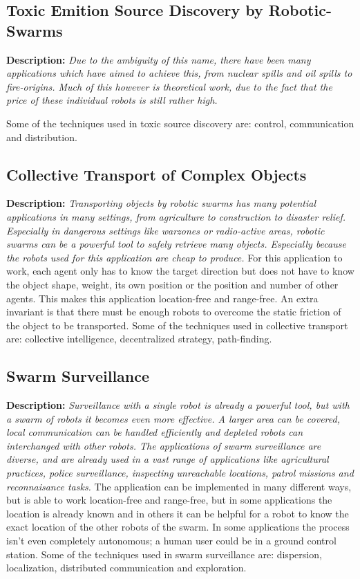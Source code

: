   \subsection{Toxic Emition Source Discovery by Robotic-Swarms}
  \textbf{Description: }\emph{Due to the ambiguity of this name, there have been many applications which have aimed to achieve this, from nuclear spills and oil spills to fire-origins. Much of this however is theoretical work, due to the fact that the price of these individual robots is still rather high.}

  Some of the techniques used in toxic source discovery are: control, communication and distribution.\cite{Li2012}

 \subsection{Collective Transport of Complex Objects}
 \textbf{Description: } \emph{Transporting objects by robotic swarms has many potential applications in many settings, from agriculture to construction to disaster relief. Especially in dangerous settings like warzones or radio-active areas, robotic swarms can be a powerful tool to safely retrieve many objects. Especially because the robots used for this application are cheap to produce. }
For this application to work, each agent only has to know the target direction but does not have to know the object shape, weight, its own position or the position and number of other agents. This makes this application location-free and range-free. An extra invariant is that there must be enough robots to overcome the static friction of the object to be transported. Some of the techniques used in collective transport are: collective intelligence, decentralized strategy, path-finding. \cite{Rubenstein}

\subsection{Swarm Surveillance}
\textbf{Description: } \emph{Surveillance with a single robot is already a powerful tool, but with a swarm of robots it becomes even more effective. A larger area can be covered, local communication can be handled efficiently and depleted robots can interchanged with other robots. The applications of swarm surveillance are diverse, and are already used in a vast range of applications like agricultural practices, police surveillance, inspecting unreachable locations, patrol missions and reconnaisance tasks.} 
The application can be implemented in many different ways, but is able to work location-free and range-free, but in some applications the location is already known and in others it can be helpful for a robot to know the exact location of the other robots of the swarm. In some applications the process isn't even completely autonomous; a human user could be in a ground control station. Some of the techniques used in swarm surveillance are: dispersion, localization, distributed communication and exploration. \cite{Burkle2010}

